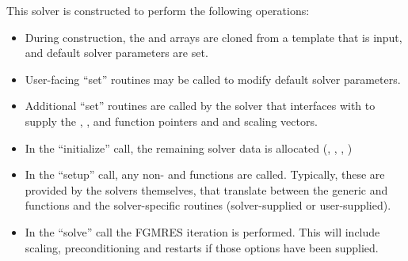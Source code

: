 This solver is constructed to perform the following operations:
\begin{itemize}
\item During construction, the  and  arrays are
  cloned from a template {\nvector} that is input, and default solver
  parameters are set.
\item User-facing ``set'' routines may be called to modify default
  solver parameters.
\item Additional ``set'' routines are called by the {\sundials} solver
  that interfaces with {\sunlinsolspfgmr} to supply the ,
  ,  and  function pointers and
   and  scaling vectors.
\item In the ``initialize'' call, the remaining solver data is
  allocated (, , ,  )
\item In the ``setup'' call, any non-  and
   functions are called.  Typically, these are provided by
  the {\sundials} solvers themselves, that translate between the
  generic  and  functions and the
  solver-specific routines (solver-supplied or user-supplied).
\item In the ``solve'' call the FGMRES iteration is performed.  This
  will include scaling, preconditioning and restarts if those options
  have been supplied.
\end{itemize}

